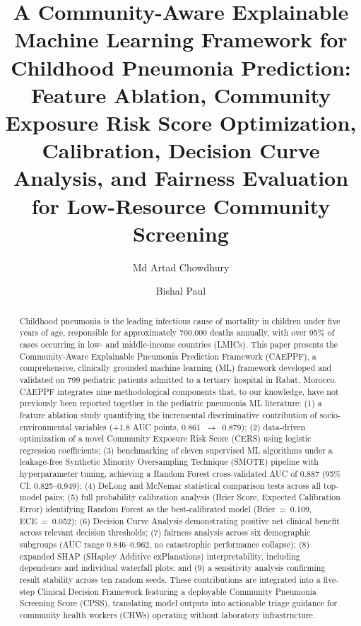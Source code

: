 \documentclass[3p,times,twocolumn]{elsarticle}
\begin{document}
\begin{frontmatter}

\title{A Community-Aware Explainable Machine Learning Framework for Childhood Pneumonia Prediction: Feature Ablation, Community Exposure Risk Score Optimization, Calibration, Decision Curve Analysis, and Fairness Evaluation for Low-Resource Community Screening}

\author[a]{Md Artad Chowdhury}
\author[a]{Bishal Paul}

\address[a]{Department of Computer Science and Engineering, [University Name], [City], Bangladesh}

\begin{abstract}
Childhood pneumonia is the leading infectious cause of mortality in children under five years of age, responsible for approximately 700{,}000 deaths annually, with over 95\% of cases occurring in low- and middle-income countries (LMICs). This paper presents the Community-Aware Explainable Pneumonia Prediction Framework (CAEPPF), a comprehensive, clinically grounded machine learning (ML) framework developed and validated on 799 pediatric patients admitted to a tertiary hospital in Rabat, Morocco. CAEPPF integrates nine methodological components that, to our knowledge, have not previously been reported together in the pediatric pneumonia ML literature: (1) a feature ablation study quantifying the incremental discriminative contribution of socio-environmental variables (+1.8 AUC points, 0.861~$\rightarrow$~0.879); (2) data-driven optimization of a novel Community Exposure Risk Score (CERS) using logistic regression coefficients; (3) benchmarking of eleven supervised ML algorithms under a leakage-free Synthetic Minority Oversampling Technique (SMOTE) pipeline with hyperparameter tuning, achieving a Random Forest cross-validated AUC of 0.887 (95\% CI: 0.825--0.949); (4) DeLong and McNemar statistical comparison tests across all top-model pairs; (5) full probability calibration analysis (Brier Score, Expected Calibration Error) identifying Random Forest as the best-calibrated model (Brier~=~0.109, ECE~=~0.052); (6) Decision Curve Analysis demonstrating positive net clinical benefit across relevant decision thresholds; (7) fairness analysis across six demographic subgroups (AUC range 0.846--0.962, no catastrophic performance collapse); (8) expanded SHAP (SHapley Additive exPlanations) interpretability, including dependence and individual waterfall plots; and (9) a sensitivity analysis confirming result stability across ten random seeds. These contributions are integrated into a five-step Clinical Decision Framework featuring a deployable Community Pneumonia Screening Score (CPSS), translating model outputs into actionable triage guidance for community health workers (CHWs) operating without laboratory infrastructure.
\end{abstract}


\end{frontmatter}
\end{document}

